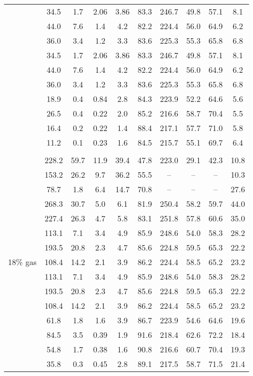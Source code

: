 \documentclass{article}
\begin{document}
\begin{landscape}
\begin{longtable}{cccccccccc}
& 34.5  &  1.7    & 2.06 & 3.86 & 83.3 & 246.7  & 49.8 & 57.1 & 8.1\\
& 44.0  &  7.6    & 1.4  &  4.2 & 82.2 & 224.4  & 56.0 & 64.9 & 6.2\\
& 36.0  &  3.4    & 1.2  &  3.3 & 83.6 & 225.3  & 55.3 & 65.8 & 6.8\\
& 34.5  &  1.7    & 2.06 & 3.86 & 83.3 & 246.7  & 49.8 & 57.1 & 8.1\\
& 44.0  &  7.6    & 1.4  &  4.2 & 82.2 & 224.4  & 56.0 & 64.9 & 6.2\\
& 36.0  &  3.4    & 1.2  &  3.3 & 83.6 & 225.3  & 55.3 & 65.8 & 6.8\\
& 18.9  &  0.4    & 0.84 &  2.8 & 84.3 & 223.9  & 52.2 & 64.6 & 5.6\\
& 26.5  &  0.4    & 0.22 &  2.0 & 85.2 & 216.6  & 58.7 & 70.4 & 5.5\\
& 16.4  &  0.2    & 0.22 &  1.4 & 88.4 & 217.1  & 57.7 & 71.0 & 5.8\\
& 11.2  &  0.1    & 0.23 &  1.6 & 84.5 & 215.7  & 55.1 & 69.7 & 6.4\\[0.3ex]\hline\\[0.3ex]
\multirow{15}{*}{\begin{sideways}{\Large{18\% gas}}\end{sideways}}
& 228.2 & 59.7    & 11.9  & 39.4  & 47.8 & 223.0  & 29.1 & 42.3 & 10.8 \\*
& 153.2 & 26.2    & 9.7   & 36.2  & 55.5 & --     & --   & --   & 10.3\\*
& 78.7  &  1.8    & 6.4   & 14.7  & 70.8 & --     & --   & --   & 27.6\\*
& 268.3 & 30.7    & 5.0   & 6.1   & 81.9 & 250.4  & 58.2 & 59.7 & 44.0\\*
& 227.4 & 26.3    & 4.7   & 5.8   & 83.1 & 251.8  & 57.8 & 60.6 & 35.0\\*
& 113.1 & 7.1     & 3.4   & 4.9   & 85.9 & 248.6  & 54.0 & 58.3 & 28.2\\*
& 193.5 & 20.8    & 2.3   &  4.7  & 85.6 & 224.8  & 59.5 & 65.3 & 22.2\\*
& 108.4 & 14.2    & 2.1   &  3.9  & 86.2 & 224.4  & 58.5 & 65.2 & 23.2\\*
& 113.1 & 7.1     & 3.4   & 4.9   & 85.9 & 248.6  & 54.0 & 58.3 & 28.2\\*
& 193.5 & 20.8    & 2.3   &  4.7  & 85.6 & 224.8  & 59.5 & 65.3 & 22.2\\*
& 108.4 & 14.2    & 2.1   &  3.9  & 86.2 & 224.4  & 58.5 & 65.2 & 23.2\\*
& 61.8  & 1.8     & 1.6   &  3.9  & 86.7 & 223.9  & 54.6 & 64.6 & 19.6\\*
& 84.5  & 3.5     & 0.39  &  1.9  & 91.6 & 218.4  & 62.6 & 72.2 & 18.4\\*
& 54.8  & 1.7     & 0.38  &  1.6  & 90.8 & 216.6  & 60.7 & 70.4 & 19.3\\*
& 35.8  & 0.3     & 0.45  &  2.8  & 89.1 & 217.5  & 58.7 & 71.5 & 21.4\\*


\end{longtable}
\end{landscape}
\end{document}

